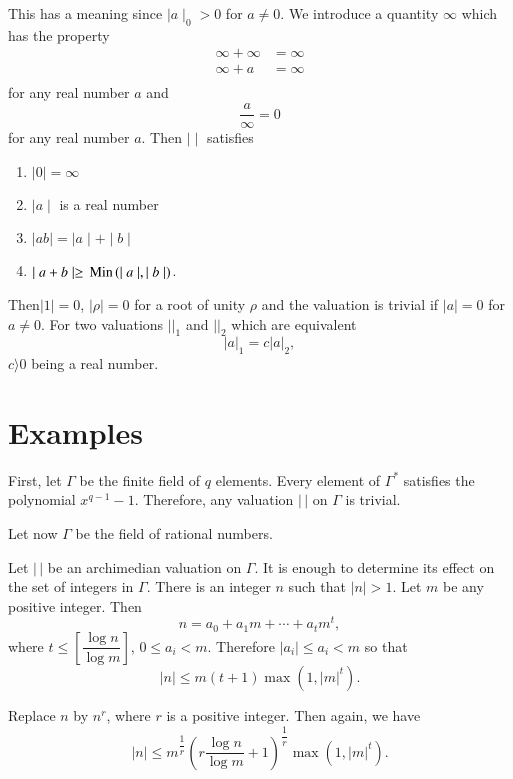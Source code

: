  This has a meaning since $ \mid a \mid_0 > 0 $  for  $ a \neq 0 $. We
 introduce a quantity $ \infty $ which has the property  
  \begin{align*}
\infty + \infty &= \infty \\
\infty +  a &=  \infty \\
 \end{align*} 
  for any real number ${a}$ and 
 $$
 \frac{a}{\infty} = 0 
 $$
 for any real number $a$. Then $ \mid \mid $ satisfies 
  \begin{enumerate}[1')]
\item $ \mid 0 \mid = \infty $

\item $ \mid a \mid $  is a real number 

\item $ \mid ab \mid  = \mid a \mid + \mid b \mid $

\item $ \mid a + b \mid \ge  \,  \operatorname{Min} \, (\mid a \mid ,  \mid b \mid)$.
 \end{enumerate} 
 
  Then\pageoriginale $|1| = 0$, $|\rho| = 0$ for a root of unity
  $\rho$ and the  valuation is trivial if $|a| = 0$ for $a \ne 0$. For
  two valuations  $| |_1$ and $| |_2$ which are equivalent  
$$
|a|_1 = c |a|_2 ,
$$
$c \rangle 0$ being a real number.



\section{Examples}%

First, let $\Gamma$ be the finite field of $q$ elements. Every element
of $\Gamma^*$ satisfies the polynomial $x^{q-1}-1$. Therefore, any
valuation $|\, |$ on $\Gamma$ is trivial. 

Let now $\Gamma$ be the field of rational numbers.

Let $|\, |$ be an archimedian valuation on $\Gamma$. It is enough to
determine its effect on the set of integers in $\Gamma$. There is an
integer $n$ such that $|n| > 1$. Let $m$ be any positive integer. 
Then
$$
n = a_0 + a_1 m + \cdots + a_t m^t ,
$$
where $t \le \left[ \dfrac {\log n} {\log m} \right]$, $0 \le a_i <
m$. Therefore $|a_i| \le a_i < m$ so that  
$$
|n| \le m (t + 1) \max (1, |m|^t).
$$

Replace $n$ by $n^r$, where $r$ is a positive integer. Then again, we
have 
$$
|n| \le m^{\dfrac{1}{r}} (r \frac{\log n}{\log m} + 1)^{\dfrac{1}{r}}
\max (1, |m| ^t). 
$$

